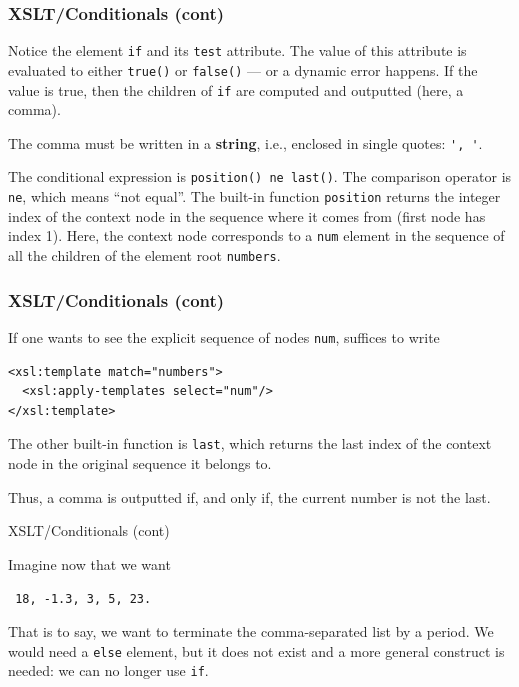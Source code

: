 %
\begin{frame}[containsverbatim]
\frametitle{XSLT/Conditionals (cont)}

Notice the \XSLT element \texttt{if} and its \texttt{test}
attribute. The value of this attribute is evaluated to either
\texttt{true()} or \texttt{false()} --- or a dynamic error happens. If
the value is true, then the children of \texttt{if} are computed and
outputted (here, a comma).

\bigskip

The comma must be written in a \textbf{string}, i.e., enclosed in
single quotes: \verb|', '|.

\bigskip

The conditional expression is \texttt{position() ne last()}. The
comparison operator is \texttt{ne}, which means ``not equal''. The
built-in function \texttt{position} returns the integer index of
the context node in the sequence where it comes from (first node has
index 1). Here, the context node corresponds to a \texttt{num} element
in the sequence of all the children of the element root
\texttt{numbers}.

\end{frame}

%
\begin{frame}[containsverbatim]
\frametitle{XSLT/Conditionals (cont)}

If one wants to see the explicit sequence of nodes \texttt{num},
suffices to write
{\small
\begin{verbatim}
<xsl:template match="numbers">
  <xsl:apply-templates select="num"/>
</xsl:template>
\end{verbatim}
}
The other built-in function is \texttt{last}, which returns the
last index of the context node in the original sequence it belongs
to.

\bigskip

Thus, a comma is outputted if, and only if, the current number is not
the last.

\end{frame}

%
\begin{frame}{XSLT/Conditionals (cont)}

Imagine now that we want
\begin{center}\tt
18, -1.3, 3, 5, 23.
\end{center}
That is to say, we want to terminate the comma-separated list by
a period. We would need a \texttt{else} element, but it does not exist
and a more general construct is needed: we can no longer use
\texttt{if}.

\end{frame}

